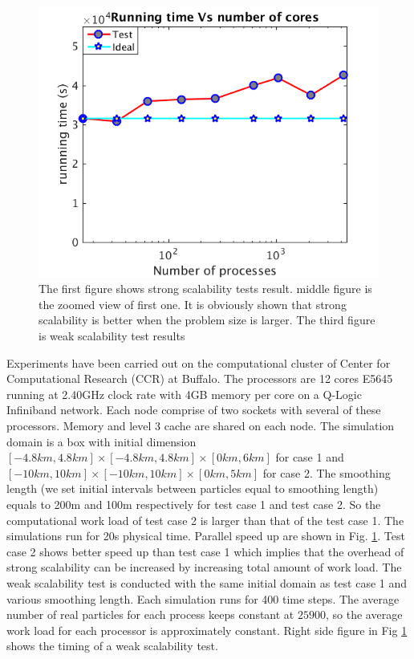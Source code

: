 \documentclass[procedia]{easychair}
\begin{document}
\begin{figure}[!t]
\includegraphics[scale=0.31]{weak_scale}
\caption{The first figure shows strong scalability tests result. middle figure is the zoomed view of first one. It is obviously shown that strong scalability is better when the problem size is larger. The third figure is weak scalability test results}
\label{fig:2cases_efficiency}
\end{figure}
%
Experiments have been carried out on the computational cluster of Center for Computational Research (CCR) at Buffalo. 
The processors are 12 cores E5645 running at 2.40GHz clock rate with 4GB memory per core on a Q-Logic Infiniband network. Each node comprise of two sockets with several of these processors. Memory and level 3 cache are shared on each node. The simulation domain is a box with initial dimension $[-4.8km, 4.8km]\times [-4.8km, 4.8km] \times [0km, 6km]$ for case 1 and $[-10km, 10km]\times [-10km, 10km] \times [0km, 5km]$ for case 2. The smoothing length (we set initial intervals between particles equal to smoothing length) equals to 200m and 100m respectively for test case 1 and test case 2. So the computational work load of test case 2 is larger than that of the test case 1. The simulations run for 20s physical time.  Parallel speed up are shown in Fig. \ref{fig:2cases_efficiency}. Test case 2 shows better speed up than test case 1 which implies that the overhead of strong scalability can be increased by increasing total amount of work load.
The weak scalability test is conducted with the same initial domain as test case 1 and various smoothing length. Each simulation runs for 400 time steps. The average number of real particles for each process keeps constant at $25900$, so the average work load for each processor is approximately constant. 
Right side figure in Fig \ref{fig:2cases_efficiency} shows the timing of a weak scalability test.\\
\end{document}
